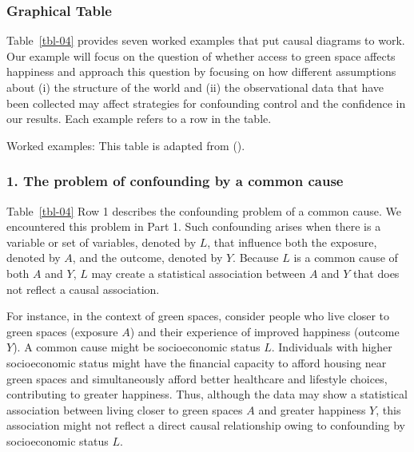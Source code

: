 \documentclass[
  singlecolumn]{article}
\begin{document}
\subsubsection{Graphical Table}\label{graphical-table}

Table~\ref{tbl-04} provides seven worked examples that put causal
diagrams to work. Our example will focus on the question of whether
access to green space affects happiness and approach this question by
focusing on how different assumptions about (i) the structure of the
world and (ii) the observational data that have been collected may
affect strategies for confounding control and the confidence in our
results. Each example refers to a row in the table.

\begin{table}

\caption{\label{tbl-04}Worked examples: This table is adapted from
().}

\centering{

\terminologyelconfoundersLONG

}

\end{table}%

\subsubsection{1. The problem of confounding by a common
cause}\label{the-problem-of-confounding-by-a-common-cause}

Table~\ref{tbl-04} Row 1 describes the confounding problem of a common
cause. We encountered this problem in Part 1. Such confounding arises
when there is a variable or set of variables, denoted by \(L\), that
influence both the exposure, denoted by \(A\), and the outcome, denoted
by \(Y.\) Because \(L\) is a common cause of both \(A\) and \(Y\), \(L\)
may create a statistical association between \(A\) and \(Y\) that does
not reflect a causal association.

For instance, in the context of green spaces, consider people who live
closer to green spaces (exposure \(A\)) and their experience of improved
happiness (outcome \(Y\)). A common cause might be socioeconomic status
\(L\). Individuals with higher socioeconomic status might have the
financial capacity to afford housing near green spaces and
simultaneously afford better healthcare and lifestyle choices,
contributing to greater happiness. Thus, although the data may show a
statistical association between living closer to green spaces \(A\) and
greater happiness \(Y\), this association might not reflect a direct
causal relationship owing to confounding by socioeconomic status \(L\).
\end{document}
